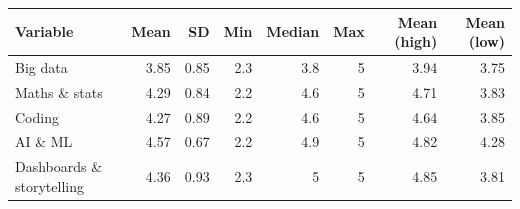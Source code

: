 \begin{tabular}{@{}l r r r r r r r@{}}
\toprule
Variable & Mean & SD & Min & Median & Max & Mean (high) & Mean (low) \\
\midrule
Big data & 3.85 & 0.85 & 2.3 & 3.8 & 5 & 3.94 & 3.75 \\
Maths \& stats & 4.29 & 0.84 & 2.2 & 4.6 & 5 & 4.71 & 3.83 \\
Coding & 4.27 & 0.89 & 2.2 & 4.6 & 5 & 4.64 & 3.85 \\
AI \& ML & 4.57 & 0.67 & 2.2 & 4.9 & 5 & 4.82 & 4.28 \\
Dashboards \& storytelling & 4.36 & 0.93 & 2.3 & 5 & 5 & 4.85 & 3.81 \\
\bottomrule
\end{tabular}

